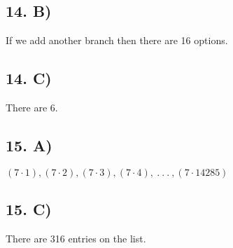 \documentclass[12]{scrartcl}
\begin{document}
\subsection*{14. B)}
If we add another branch then there are 16 options.
\subsection*{14. C)}
There are 6. 
\subsection*{15. A)}
$(7\cdot 1), (7\cdot 2), (7\cdot 3),(7\cdot 4), \ .\ .\ . \ ,(7\cdot 14285)$
\subsection*{15. C)}
There are 316 entries on the list. 
\end{document}
